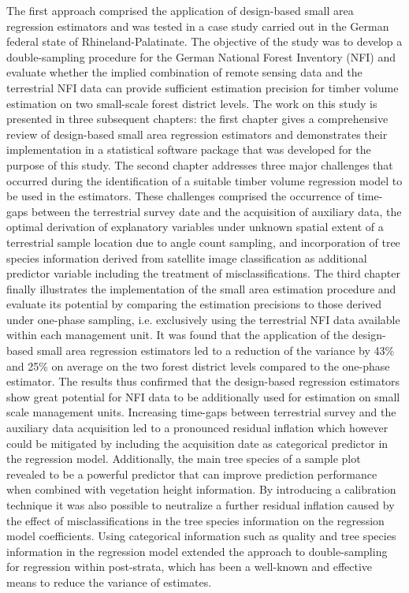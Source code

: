 The first approach comprised the application of design-based small area regression estimators and was tested in a case study carried out in the German federal state of Rhineland-Palatinate. The objective of the study was to develop a double-sampling procedure for the German National Forest Inventory (NFI) and evaluate whether the implied combination of remote sensing data and the terrestrial NFI data can provide sufficient estimation precision for timber volume estimation on two small-scale forest district levels. The work on this study is presented in three subsequent chapters: the first chapter gives a comprehensive review of design-based small area regression estimators and demonstrates their implementation in a statistical software package that was developed for the purpose of this study. The second chapter addresses three major challenges that occurred during the identification of a suitable timber volume regression model to be used in the estimators. These challenges comprised the occurrence of time-gaps between the terrestrial survey date and the acquisition of auxiliary data, the optimal derivation of explanatory variables under unknown spatial extent of a terrestrial sample location due to angle count sampling, and incorporation of tree species information derived from satellite image classification as additional predictor variable including the treatment of misclassifications. The third chapter finally illustrates the implementation of the small area estimation procedure and evaluate its potential by comparing the estimation precisions to those derived under one-phase sampling, i.e. exclusively using the terrestrial NFI data available within each management unit. It was found that the application of the design-based small area regression estimators led to a reduction of the variance by 43\% and 25\% on average on the two forest district levels compared to the one-phase estimator. The results thus confirmed that the design-based regression estimators show great potential for NFI data to be additionally used for estimation on small scale management units. Increasing time-gaps between terrestrial survey and the auxiliary data acquisition led to a pronounced residual inflation which however could be mitigated by including the acquisition date as categorical predictor in the regression model. Additionally, the main tree species of a sample plot revealed to be a powerful predictor that can improve prediction performance when combined with vegetation height information. By introducing a calibration technique it was also possible to neutralize a further residual inflation caused by the effect of misclassifications in the tree species information on the regression model coefficients. Using categorical information such as quality and tree species information in the regression model extended the approach to double-sampling for regression within post-strata, which has been a well-known and effective means to reduce the variance of estimates.\par

